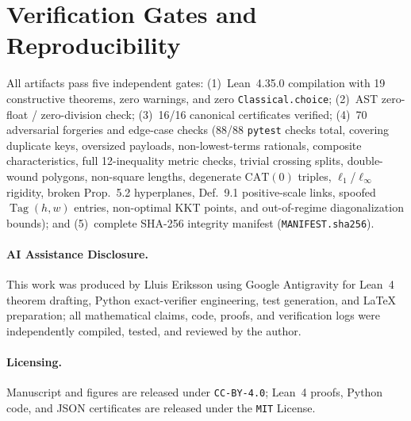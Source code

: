 \documentclass[10pt,twocolumn]{article}
\begin{document}
\section{Verification Gates and Reproducibility}
{\raggedright
All artifacts pass five independent gates: (1)~Lean~4.35.0 compilation with 19 constructive theorems, zero warnings, and zero \texttt{Classical.choice}; (2)~AST zero-float / zero-division check; (3)~16/16 canonical certificates verified; (4)~70 adversarial forgeries and edge-case checks (88/88 \texttt{pytest} checks total, covering duplicate keys, oversized payloads, non-lowest-terms rationals, composite characteristics, full 12-inequality metric checks, trivial crossing splits, double-wound polygons, non-square lengths, degenerate $\mathrm{CAT}(0)$ triples, $\ell_1$/$\ell_\infty$ rigidity, broken Prop.~5.2 hyperplanes, Def.~9.1 positive-scale links, spoofed $\operatorname{Tag}(h,w)$ entries, non-optimal KKT points, and out-of-regime diagonalization bounds); and (5)~complete SHA-256 integrity manifest (\texttt{MANIFEST.sha256}).\par}

\paragraph{AI Assistance Disclosure.}
This work was produced by Lluis Eriksson using Google Antigravity for Lean~4 theorem drafting, Python exact-verifier engineering, test generation, and \LaTeX{} preparation; all mathematical claims, code, proofs, and verification logs were independently compiled, tested, and reviewed by the author.

\paragraph{Licensing.}
Manuscript and figures are released under \texttt{CC-BY-4.0}; Lean~4 proofs, Python code, and JSON certificates are released under the \texttt{MIT} License.

{\footnotesize\raggedright


}
\end{document}
